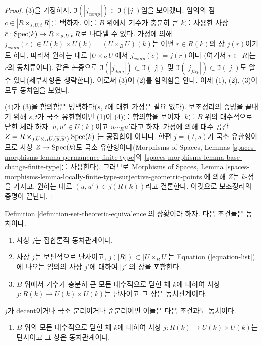 \begin{proof}
\medskip\noindent
(3)을 가정하자. $\Im(|j_{comp}|) \subset \Im(|j|)$임을 보이겠다.
임의의 점 $c \in |R \times_{s, U, t} R|$를 택하자.
이를 $B$ 위에서 기수가 충분히 큰 $k$를 사용한 사상
$\overline{c} : \mathop{\mathrm{Spec}}(k) \to R \times_{s, U, t} R$로 나타낼 수 있다.
가정에 의해
$j_{comp}(\overline{c}) \in U(k) \times U(k) = (U \times_B U)(k)$는
어떤 $\overline{r} \in R(k)$의 상 $j(\overline{r})$이기도 하다.
따라서 원하는 대로 $|U \times_B U|$에서 $j_{comp}(c) = j(r)$이다
(여기서 $r \in |R|$는 $\overline{r}$의 동치류이다).
같은 논증으로
$\Im(|j_{diag}|) \subset \Im(|j|)$ 및
$\Im(|j_{flip}|) \subset \Im(|j|)$도 알 수 있다(세부사항은 생략한다).
이로써 (3)이 (2)를 함의함을 안다. 이제 (1), (2), (3)이 모두
동치임을 보였다.

\medskip\noindent
(4)가 (3)을 함의함은 명백하다($s$, $t$에 대한 가정은 필요 없다).
보조정리의 증명을 끝내기 위해 $s, t$가 국소 유한형이면
(1)이 (4)를 함의함을 보이자. $k$를 $B$ 위의 대수적으로 닫힌
체라 하자. $\overline{u}, \overline{u}' \in U(k)$이고
$\overline{u} \sim_R \overline{u}'$라고 하자. 가정에 의해 대수 공간
$Z = R \times_{j, U \times_B U, (\overline{u}, \overline{u}')} \mathop{\mathrm{Spec}}(k)$
는 공집합이 아니다. 한편 $j = (t, s)$가 국소 유한형이므로
사상 $Z \to \mathop{\mathrm{Spec}}(k)$도 국소 유한형이다(Morphisms of Spaces, Lemmas
\ref{spaces-morphisms-lemma-permanence-finite-type}와
\ref{spaces-morphisms-lemma-base-change-finite-type}를 사용한다).
그러므로 Morphisms of Spaces, Lemma
\ref{spaces-morphisms-lemma-locally-finite-type-surjective-geometric-points}에
의해 $Z$는 $k$-점을 가지고, 원하는 대로
$(\overline{u}, \overline{u}') \in j(R(k))$라고 결론한다.
이것으로 보조정리의 증명이 끝난다.
\end{proof}

\begin{lemma}
\label{lemma-set-theoretic-equivalence-geometric}
Definition \ref{definition-set-theoretic-equivalence}의 상황이라 하자.
다음 조건들은 동치이다.
\begin{enumerate}
\item 사상 $j$는 집합론적 동치관계이다.
\item 사상 $j$는 보편적으로 단사이고,
$j(|R|) \subset |U \times_B U|$는 Equation
(\ref{equation-list})에 나오는 임의의 사상 $j'$에 대하여
$|j'|$의 상을 포함한다.
\item $B$ 위에서 기수가 충분히 큰 모든 대수적으로 닫힌 체 $k$에
대하여 사상 $j : R(k) \to U(k) \times U(k)$는 단사이고
그 상은 동치관계이다.
\end{enumerate}
$j$가 decent이거나 국소 분리이거나 준분리이면 이들은
다음 조건과도 동치이다.
\begin{enumerate}
\item[(4)] $B$ 위의 모든 대수적으로 닫힌 체 $k$에 대하여
사상 $j : R(k) \to U(k) \times U(k)$는 단사이고
그 상은 동치관계이다.
\end{enumerate}
\end{lemma}

